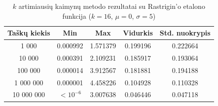 \begin{table}[H]
    \centering
    \begin{tabular}{|c|c|c|c|c|}
        \hline
        \textbf{Taškų kiekis} & \textbf{Min} & \textbf{Max} & \textbf{Vidurkis} & \textbf{Std. nuokrypis} \\ \hline
        1 000        & 0.000992 & 1.571379 & 0.199196 & 0.222664 \\ \hline
        10 000       & 0.000391 & 2.109231 & 0.185917 & 0.193064 \\ \hline
        100 000      & 0.000014 & 3.912567 & 0.181881 & 0.194188 \\ \hline
        1 000 000    & 0.000001 & 4.458226 & 0.104928 & 0.110328 \\ \hline
        10 000 000   & $<10^{-6}$ & 3.007638 & 0.046446 & 0.047118 \\ \hline
    \end{tabular}
    \caption{$k$ artimiausių kaimynų metodo rezultatai su Rastrigin'o etalono funkcija ($k = 16$, $\mu = 0$, $\sigma = 5$)}
\end{table}